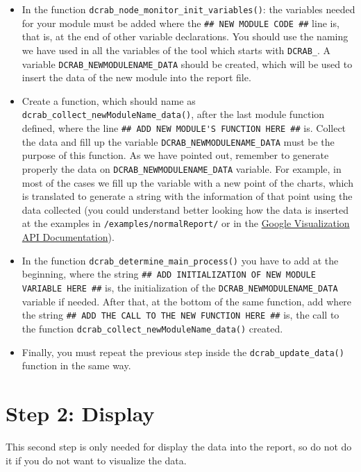 \documentclass[10pt,a4paper]{report}
\begin{document}
\begin{itemize}
  \item In the function \texttt{dcrab\_node\_monitor\_init\_variables()}: the variables needed for your module must be added where the \verb+## NEW MODULE CODE ##+ line is, that is, at the end of other variable declarations. You should use the naming we have used in all the variables of the tool which starts with \verb+DCRAB_+. A variable \verb+DCRAB_NEWMODULENAME_DATA+ should be created, which will be used to insert the data of the new module into the report file.
  \item Create a function, which should name as \texttt{dcrab\_collect\_newModuleName\_data()}, after the last module function defined, where the line \verb+## ADD NEW MODULE'S FUNCTION HERE ##+ is. Collect the data and fill up the variable \verb+DCRAB_NEWMODULENAME_DATA+ must be the purpose of this function. As we have pointed out, remember to generate properly the data on \verb+DCRAB_NEWMODULENAME_DATA+ variable. For example, in most of the cases we fill up the variable with a new point of the charts, which is translated to generate a string with the information of that point using the data collected (you could understand better looking how the data is inserted at the examples in \verb+/examples/normalReport/+ or in the \href{https://developers.google.com/chart/interactive/docs/reference}{Google Visualization API Documentation}).
  \item In the function \texttt{dcrab\_determine\_main\_process()} you have to add at the beginning, where the string \verb+## ADD INITIALIZATION OF NEW MODULE VARIABLE HERE ##+ is, the initialization of the \verb+DCRAB_NEWMODULENAME_DATA+ variable if needed. After that, at the bottom of the same function, add where the string \verb+## ADD THE CALL TO THE NEW FUNCTION HERE ##+ is, the call to the function \texttt{dcrab\_collect\_newModuleName\_data()} created.
  \item Finally, you must repeat the previous step inside the \texttt{dcrab\_update\_data()} function in the same way.
\end{itemize}

\section{Step 2: Display}

This second step is only needed for display the data into the report, so do not do it if you do not want to visualize the data.
\end{document}
